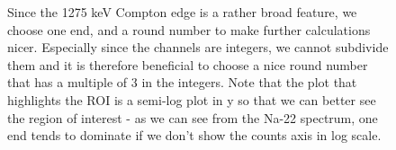 \documentclass{article}
\begin{document}
\begin{figure}[!htb]
\begin{tabular}{c c}
    \end{tabular}
    \caption{Since the 1275 keV Compton edge is a rather broad feature, we choose one end, and a round number to make further calculations nicer.  Especially since the channels are integers, we cannot subdivide them and it is therefore beneficial to choose a nice round number that has a multiple of 3 in the integers.  Note that the plot that highlights the ROI is a semi-log plot in y so that we can better see the region of interest - as we can see from the Na-22 spectrum, one end tends to dominate if we don't show the counts axis in log scale.}
    \label{roi}
  \end{figure}
\end{document}
